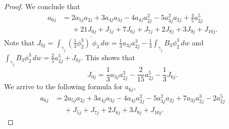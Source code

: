 \begin{proof}
We conclude that 
\begin{align*} 
a_{6j} &=	2a_{5j}a_{2j}+3a_{4j}a_{3j}-4a_{4j}a_{2j}^2-5a_{3j}^2a_{2j}+\frac{4}{5}a_{2j}^5 \\
&\phantom{=}	+21J_{0j}+J_{5j}+7J_{6j}+J_{7j}+2J_{8j}+3J_{9j}+J_{10j}.
\end{align*}
Note that $J_{0j}=\int_{\gamma_j}\left(\frac{1}{3}\phi_2^3\right)^{\prime}\phi_3\,dw=\frac{1}{3}a_{3j}a_{2j}^3-\frac{1}{3}\int_{\gamma_j}B_3\phi_2^3\,dw$ and $\int_{\gamma_j}B_3\phi_2^3\,dw=\frac{2}{5}a_{2j}^5+J_{6j}$. This shows that
\[ J_{0j}=\frac{1}{3}a_{3j}a_{2j}^3-\frac{2}{15}a_{2j}^5-\frac{1}{3}J_{6j}. \]
We arrive to the following formula for $a_{6j}$,
\begin{align}\label{eq:a6-v1}
a_{6j}	&= 2a_{5j}a_{2j}+3a_{4j}a_{3j}-4a_{4j}a_{2j}^2-5a_{3j}^2a_{2j}+7a_{3j}a_{2j}^3-2a_{2j}^5\nonumber \\
&\phantom{=}	+J_{5j}+J_{7j}+2J_{8j}+3J_{9j}+J_{10j}.
\end{align}


\end{proof}
